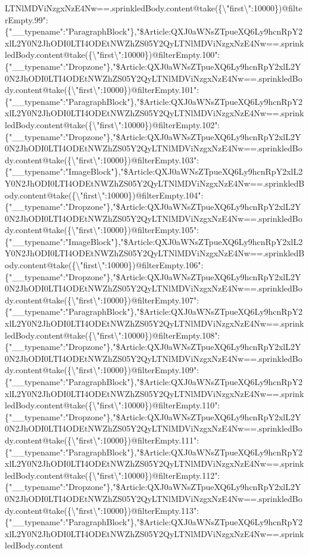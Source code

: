LTNlMDViNzgxNzE4Nw==.sprinkledBody.content@take(\{\textbackslash{}"first\textbackslash{}":10000\})@filterEmpty.99":\{"\_\_typename":"ParagraphBlock"\},"\$Article:QXJ0aWNsZTpueXQ6Ly9hcnRpY2xlL2Y0N2JhODI0LTI4ODEtNWZhZS05Y2QyLTNlMDViNzgxNzE4Nw==.sprinkledBody.content@take(\{\textbackslash{}"first\textbackslash{}":10000\})@filterEmpty.100":\{"\_\_typename":"Dropzone"\},"\$Article:QXJ0aWNsZTpueXQ6Ly9hcnRpY2xlL2Y0N2JhODI0LTI4ODEtNWZhZS05Y2QyLTNlMDViNzgxNzE4Nw==.sprinkledBody.content@take(\{\textbackslash{}"first\textbackslash{}":10000\})@filterEmpty.101":\{"\_\_typename":"ParagraphBlock"\},"\$Article:QXJ0aWNsZTpueXQ6Ly9hcnRpY2xlL2Y0N2JhODI0LTI4ODEtNWZhZS05Y2QyLTNlMDViNzgxNzE4Nw==.sprinkledBody.content@take(\{\textbackslash{}"first\textbackslash{}":10000\})@filterEmpty.102":\{"\_\_typename":"Dropzone"\},"\$Article:QXJ0aWNsZTpueXQ6Ly9hcnRpY2xlL2Y0N2JhODI0LTI4ODEtNWZhZS05Y2QyLTNlMDViNzgxNzE4Nw==.sprinkledBody.content@take(\{\textbackslash{}"first\textbackslash{}":10000\})@filterEmpty.103":\{"\_\_typename":"ImageBlock"\},"\$Article:QXJ0aWNsZTpueXQ6Ly9hcnRpY2xlL2Y0N2JhODI0LTI4ODEtNWZhZS05Y2QyLTNlMDViNzgxNzE4Nw==.sprinkledBody.content@take(\{\textbackslash{}"first\textbackslash{}":10000\})@filterEmpty.104":\{"\_\_typename":"Dropzone"\},"\$Article:QXJ0aWNsZTpueXQ6Ly9hcnRpY2xlL2Y0N2JhODI0LTI4ODEtNWZhZS05Y2QyLTNlMDViNzgxNzE4Nw==.sprinkledBody.content@take(\{\textbackslash{}"first\textbackslash{}":10000\})@filterEmpty.105":\{"\_\_typename":"ImageBlock"\},"\$Article:QXJ0aWNsZTpueXQ6Ly9hcnRpY2xlL2Y0N2JhODI0LTI4ODEtNWZhZS05Y2QyLTNlMDViNzgxNzE4Nw==.sprinkledBody.content@take(\{\textbackslash{}"first\textbackslash{}":10000\})@filterEmpty.106":\{"\_\_typename":"Dropzone"\},"\$Article:QXJ0aWNsZTpueXQ6Ly9hcnRpY2xlL2Y0N2JhODI0LTI4ODEtNWZhZS05Y2QyLTNlMDViNzgxNzE4Nw==.sprinkledBody.content@take(\{\textbackslash{}"first\textbackslash{}":10000\})@filterEmpty.107":\{"\_\_typename":"ParagraphBlock"\},"\$Article:QXJ0aWNsZTpueXQ6Ly9hcnRpY2xlL2Y0N2JhODI0LTI4ODEtNWZhZS05Y2QyLTNlMDViNzgxNzE4Nw==.sprinkledBody.content@take(\{\textbackslash{}"first\textbackslash{}":10000\})@filterEmpty.108":\{"\_\_typename":"Dropzone"\},"\$Article:QXJ0aWNsZTpueXQ6Ly9hcnRpY2xlL2Y0N2JhODI0LTI4ODEtNWZhZS05Y2QyLTNlMDViNzgxNzE4Nw==.sprinkledBody.content@take(\{\textbackslash{}"first\textbackslash{}":10000\})@filterEmpty.109":\{"\_\_typename":"ParagraphBlock"\},"\$Article:QXJ0aWNsZTpueXQ6Ly9hcnRpY2xlL2Y0N2JhODI0LTI4ODEtNWZhZS05Y2QyLTNlMDViNzgxNzE4Nw==.sprinkledBody.content@take(\{\textbackslash{}"first\textbackslash{}":10000\})@filterEmpty.110":\{"\_\_typename":"Dropzone"\},"\$Article:QXJ0aWNsZTpueXQ6Ly9hcnRpY2xlL2Y0N2JhODI0LTI4ODEtNWZhZS05Y2QyLTNlMDViNzgxNzE4Nw==.sprinkledBody.content@take(\{\textbackslash{}"first\textbackslash{}":10000\})@filterEmpty.111":\{"\_\_typename":"ParagraphBlock"\},"\$Article:QXJ0aWNsZTpueXQ6Ly9hcnRpY2xlL2Y0N2JhODI0LTI4ODEtNWZhZS05Y2QyLTNlMDViNzgxNzE4Nw==.sprinkledBody.content@take(\{\textbackslash{}"first\textbackslash{}":10000\})@filterEmpty.112":\{"\_\_typename":"Dropzone"\},"\$Article:QXJ0aWNsZTpueXQ6Ly9hcnRpY2xlL2Y0N2JhODI0LTI4ODEtNWZhZS05Y2QyLTNlMDViNzgxNzE4Nw==.sprinkledBody.content@take(\{\textbackslash{}"first\textbackslash{}":10000\})@filterEmpty.113":\{"\_\_typename":"ParagraphBlock"\},"\$Article:QXJ0aWNsZTpueXQ6Ly9hcnRpY2xlL2Y0N2JhODI0LTI4ODEtNWZhZS05Y2QyLTNlMDViNzgxNzE4Nw==.sprinkledBody.content